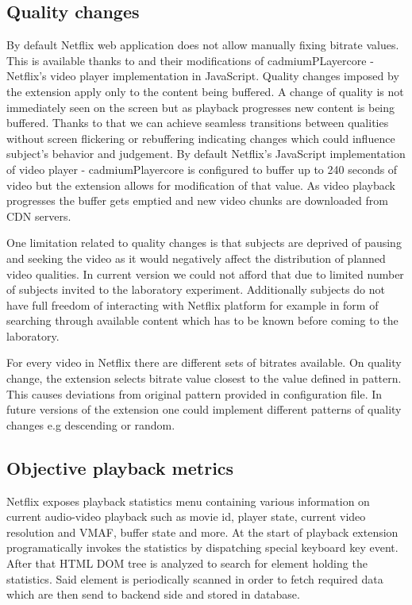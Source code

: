 \documentclass[conference]{IEEEtran}
\begin{document}
\subsection{Quality changes}
By default Netflix web application does not allow manually fixing bitrate values. This is available thanks to \cite{netflix-1080p} and their modifications of cadmiumPLayercore - Netflix's video player implementation in JavaScript.
Quality changes imposed by the extension apply only to the content being buffered. A change of quality is not immediately seen on the screen but as playback progresses new content is being buffered. Thanks to that we can achieve seamless transitions between qualities without screen flickering or rebuffering indicating changes which could influence subject's behavior and judgement.
By default Netflix's JavaScript implementation of video player - cadmiumPlayercore is configured to buffer up to 240 seconds of video but the extension allows for modification of that value.
As video playback progresses the buffer gets emptied and new video chunks are downloaded from CDN servers. 

One limitation related to quality changes is that subjects are deprived of pausing and seeking the video as it would negatively affect the distribution of planned video qualities. In current version we could not afford that due to limited number of subjects invited to the laboratory experiment. Additionally subjects do not have full freedom of interacting with Netflix platform for example in form of searching through available content which has to be known before coming to the laboratory. 

For every video in Netflix there are different sets of bitrates available. On quality change, the extension selects bitrate value closest to the value defined in pattern. This causes deviations from original pattern provided in configuration file. In future versions of the extension one could implement different patterns of quality changes e.g descending or random.

\subsection{Objective playback metrics}
Netflix exposes playback statistics menu containing various information on current audio-video playback such as movie id, player state, current video resolution and VMAF, buffer state and more.  At the start of playback extension programatically invokes the statistics by dispatching special keyboard key event. After that HTML DOM tree is analyzed to search for element holding the statistics. Said element is periodically scanned in order to fetch required data which are then send to backend side and stored in database.
\end{document}
